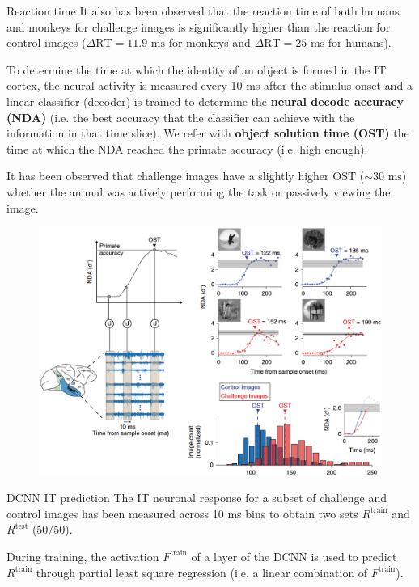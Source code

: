 \begin{casestudy}
\begin{descriptionlist}
        \item[Reaction time]
            It also has been observed that the reaction time of both humans and monkeys for challenge images is significantly higher than the reaction for control images
            ($\Delta\text{RT} = 11.9 \text{ ms}$ for monkeys and $\Delta\text{RT} = 25 \text{ ms}$ for humans).
        
            To determine the time at which the identity of an object is formed in the IT cortex, 
            the neural activity is measured every 10 ms after the stimulus onset and a linear classifier (decoder) is trained to determine the \textbf{neural decode accuracy (NDA)}
            (i.e. the best accuracy that the classifier can achieve with the information in that time slice).
            We refer with \textbf{object solution time (OST)} the time at which the NDA reached the primate accuracy (i.e. high enough).
        
            It has been observed that challenge images have a slightly higher OST ($\sim 30 \text{ ms}$) 
            whether the animal was actively performing the task or passively viewing the image.
            \begin{figure}[H]
                \centering
                \includegraphics[width=0.7\linewidth]{./img/recognition_reaction3.png}
            \end{figure}

        \item[DCNN IT prediction]
            The IT neuronal response for a subset of challenge and control images has been measured across 10 ms bins
            to obtain two sets $R^\text{train}$ and $R^\text{test}$ (50/50).
            
            During training, the activation $F^\text{train}$ of a layer of the DCNN is used to predict $R^\text{train}$ 
            through partial least square regression (i.e. a linear combination of $F^\text{train}$).


\end{descriptionlist}
\end{casestudy}
